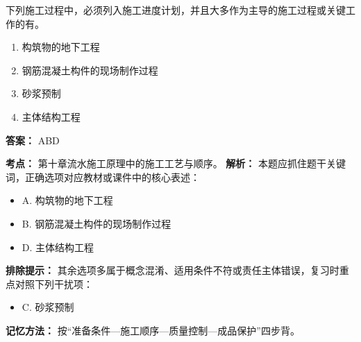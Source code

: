 \documentclass[UTF8,fontset=fandol,11pt]{ctexart}
\begin{document}
\begin{quizbox}[title={第 18 题}]
下列施工过程中，必须列入施工进度计划，并且大多作为主导的施工过程或关键工作的有。\\
\begin{enumerate}[label=\Alph*.]
\item 构筑物的地下工程
\item 钢筋混凝土构件的现场制作过程
\item 砂浆预制
\item 主体结构工程
\end{enumerate}
\textbf{答案：} ABD
\vspace{0.25em}
\begin{answerbox}[title={考点解析}]
\textbf{考点：} 第十章流水施工原理中的施工工艺与顺序。
\textbf{解析：} 本题应抓住题干关键词，正确选项对应教材或课件中的核心表述：
\begin{itemize}
\item A. 构筑物的地下工程
\item B. 钢筋混凝土构件的现场制作过程
\item D. 主体结构工程
\end{itemize}
\textbf{排除提示：} 其余选项多属于概念混淆、适用条件不符或责任主体错误，复习时重点对照下列干扰项：
\begin{itemize}
\item C. 砂浆预制
\end{itemize}
\textbf{记忆方法：} 按“准备条件—施工顺序—质量控制—成品保护”四步背。
\end{answerbox}
\end{quizbox}

\vspace{0.2em}
\end{document}
